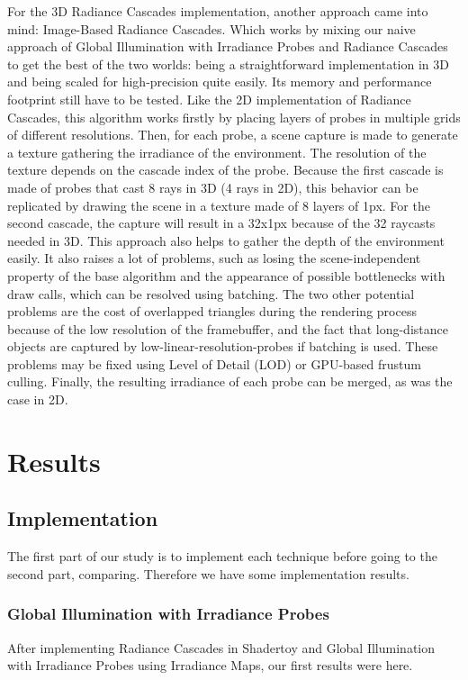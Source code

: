 \documentclass{rapportCS}
\begin{document}
For the 3D Radiance Cascades implementation, another approach came into mind: Image-Based Radiance Cascades. Which works by mixing our naive approach of Global Illumination with Irradiance Probes and Radiance Cascades to get the best of the two worlds: being a straightforward implementation in 3D and being scaled for high-precision quite easily. Its memory and performance footprint still have to be tested. 
Like the 2D implementation of Radiance Cascades, this algorithm works firstly by placing layers of probes in multiple grids of different resolutions. Then, for each probe, a scene capture is made to generate a texture gathering the irradiance of the environment. The resolution of the texture depends on the cascade index of the probe. Because the first cascade is made of probes that cast 8 rays in 3D (4 rays in 2D), this behavior can be replicated by drawing the scene in a texture made of 8 layers of 1px. For the second cascade, the capture will result in a 32x1px because of the 32 raycasts needed in 3D.
This approach also helps to gather the depth of the environment easily. It also raises a lot of problems, such as losing the scene-independent property of the base algorithm and the appearance of possible bottlenecks with draw calls, which can be resolved using batching. The two other potential problems are the cost of overlapped triangles during the rendering process because of the low resolution of the framebuffer, and the fact that long-distance objects are captured by low-linear-resolution-probes if batching is used. These problems may be fixed using Level of Detail (LOD) or GPU-based frustum culling.
Finally, the resulting irradiance of each probe can be merged, as was the case in 2D.



\section{Results}

\subsection{Implementation}
The first part of our study is to implement each technique before going to the second part, comparing. Therefore we have some implementation results.

\subsubsection{Global Illumination with Irradiance Probes}
After implementing Radiance Cascades in Shadertoy and Global Illumination with Irradiance Probes using Irradiance Maps, our first results were here. 
\end{document}
